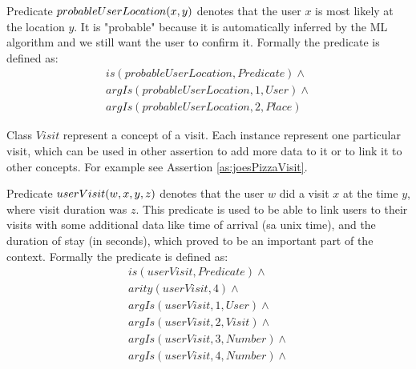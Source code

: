 \begin{definition}
\label{pred:probableUserLocation}

Predicate $\\probableUserLocation(x,y)$ denotes that the user $x$ is most likely
at the location $y$. It is "probable" because it is automatically inferred by 
the ML algorithm and we still want the user to confirm it.
Formally the predicate is defined as:
\begin{equation}\label{as:probableUserLoc}
\begin{gathered}
    is(probableUserLocation,Predicate) \land \\
	argIs(probableUserLocation,1,User) \land\\
	argIs(probableUserLocation,2, Place)
\end{gathered}
\end{equation}
\end{definition}

\begin{definition}\label{def:visit}
Class $Visit$ represent a concept of a visit. Each instance represent one
particular visit, which can be used in other assertion to add more data to it
or to link it to other concepts. For example see Assertion 
\ref{as:joesPizzaVisit}.
\end{definition}

\begin{definition}
\label{pred:userVisit}
Predicate $\\userVisit(w,x,y,z)$ denotes that the user $w$ did a visit $x$
at the time $y$, where visit duration was $z$. This predicate is used to be 
able to link users to their visits with some additional data like time of
arrival (sa unix time), and the duration of stay (in seconds), which proved to 
be an important part of the context. Formally the predicate is defined as:
\begin{equation}\label{as:userVisit}
\begin{gathered}
    is(userVisit,Predicate) \land \\
	arity(userVisit,4) \land \\
	argIs(userVisit,1,User) \land\\
	argIs(userVisit,2, Visit) \land \\
	argIs(userVisit,3,Number) \land \\
	argIs(userVisit,4,Number) \land
\end{gathered}
\end{equation}
\end{definition}

